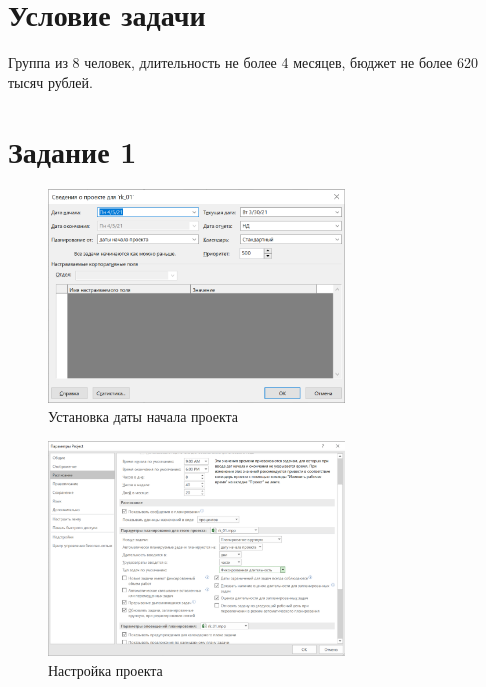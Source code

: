 \section{Условие задачи}

Группа из 8 человек, длительность не более 4 месяцев, бюджет не более 620 тысяч рублей.

\section{Задание 1}

\begin{figure}[H]
    \centering
    \includegraphics[width=0.7\textwidth]{img/content/task_01_1.png}
    \caption{Установка даты начала проекта}
    \label{fig:task_01_1}
\end{figure}

\begin{figure}[H]
    \centering
    \includegraphics[width=0.7\textwidth]{img/content/task_01_2.png}
    \caption{Настройка проекта}
    \label{fig:task_01_2}
\end{figure}

